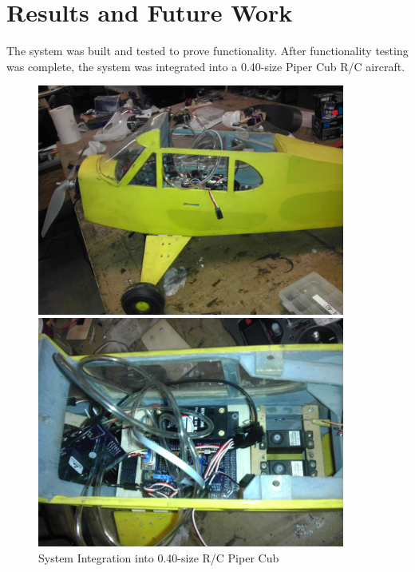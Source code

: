 \section{Results and Future Work}
\label{results}
The system was built and tested to prove functionality. After functionality testing was complete, the system was integrated into a 0.40-size Piper Cub R/C aircraft.

\begin{figure}[H]
\label{sysIntPics}
\begin{center}
\begin{minipage}[b]{0.45\linewidth}
  \centering
    \includegraphics[width=0.9\textwidth]{figures/sysInt1.jpg}
\end{minipage}
\begin{minipage}[b]{0.45\linewidth}
  \centering
    \includegraphics[width=0.9\textwidth]{figures/sysInt2.jpg}
\end{minipage}
\end{center}
\caption{System Integration into 0.40-size R/C Piper Cub}
\end{figure}
